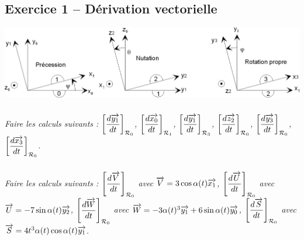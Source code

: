 \documentclass[10pt,oneside]{article}
\begin{document}
\subsection*{Exercice 1 -- Dérivation vectorielle}
\begin{center}
\includegraphics[width=.95\textwidth]{png/fig1}
\end{center}


\subparagraph{}
\textit{Faire les calculs suivants : 
$\left[ \dfrac{d\overrightarrow{y_1}}{dt}\right]_{\mathcal{R}_0}$, 
$\left[ \dfrac{d\overrightarrow{x_0}}{dt}\right]_{\mathcal{R}_1}$, 
$\left[ \dfrac{d\overrightarrow{y_1}}{dt}\right]_{\mathcal{R}_3}$, 
$\left[ \dfrac{d\overrightarrow{z_2}}{dt}\right]_{\mathcal{R}_0}$, 
$\left[ \dfrac{d\overrightarrow{y_3}}{dt}\right]_{\mathcal{R}_0}$, 
$\left[ \dfrac{d\overrightarrow{x_3}}{dt}\right]_{\mathcal{R}_0}$.}
\subparagraph{}
\textit{Faire les calculs suivants : 
$\left[ \dfrac{d\overrightarrow{V}}{dt}\right]_{\mathcal{R}_0}$ avec $\overrightarrow{V} = 3\cos\alpha(t)\overrightarrow{x_1}$,
$\left[ \dfrac{d\overrightarrow{U}}{dt}\right]_{\mathcal{R}_0}$ avec $\overrightarrow{U} = -7\sin\alpha(t)\overrightarrow{y_2}$,
$\left[ \dfrac{d\overrightarrow{W}}{dt}\right]_{\mathcal{R}_0}$ avec $\overrightarrow{W} = -3\alpha(t)^3\overrightarrow{y_1}+6\sin\alpha(t)\overrightarrow{y_0}$,
$\left[ \dfrac{d\overrightarrow{S}}{dt}\right]_{\mathcal{R}_0}$ avec $\overrightarrow{S} = 4t^3\alpha(t)\cos\alpha(t)\overrightarrow{y_1}$.
}
\end{document}
